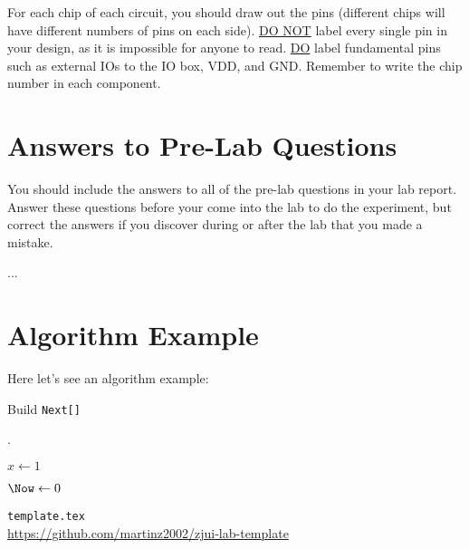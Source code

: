 \documentclass[a4paper]{article}
\begin{document}
    For each chip of each circuit, you should draw out the pins (different chips will have 
    different numbers of pins on each side). \underline{DO NOT} label every single pin in your design, 
    as it is impossible for anyone to read. \underline{DO} label fundamental pins such as external IOs to 
    the IO box, VDD, and GND. Remember to write the chip number in each component.

    \section{Answers to Pre-Lab Questions}
    You should include the answers to all of the pre-lab questions in your lab report. Answer 
    these questions before your come into the lab to do the experiment, but correct the 
    answers if you discover during or after the lab that you made a mistake.

    ... 

    

    \section{Algorithm Example}

    Here let's see an algorithm example:

    \begin{algorithm}
        \caption{Build \texttt{Next[]}}
        \label{alg-build-next}

        \Next.

        $x \gets 1$

        $\Now \gets 0$

    \end{algorithm}

    \begin{flushright}
        \texttt{template.tex}~\VERSION\\
        \url{https://github.com/martinz2002/zjui-lab-template}
    \end{flushright}
\end{document}

